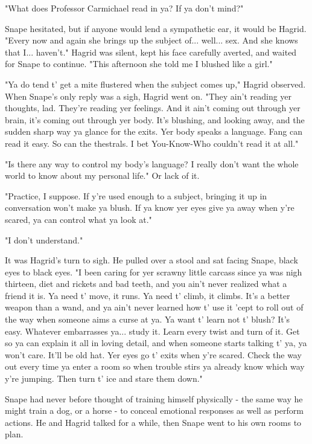 \documentclass[a4paper,11pt]{article}
\begin{document}
"What does Professor Carmichael read in ya? If ya don't mind?"

Snape hesitated, but if anyone would lend a sympathetic ear, it would be Hagrid. "Every now and again she brings up the subject of... well... sex. And she knows that I... haven't." Hagrid was silent, kept his face carefully averted, and waited for Snape to continue. "This afternoon she told me I blushed like a girl."

"Ya do tend t' get a mite flustered when the subject comes up," Hagrid observed. When Snape's only reply was a sigh, Hagrid went on. "They ain't reading yer thoughts, lad. They're reading yer feelings. And it ain't coming out through yer brain, it's coming out through yer body. It's blushing, and looking away, and the sudden sharp way ya glance for the exits. Yer body speaks a language. Fang can read it easy. So can the thestrals. I bet You-Know-Who couldn't read it at all."

"Is there any way to control my body's language? I really don't want the whole world to know about my personal life." Or lack of it.

"Practice, I suppose. If y're used enough to a subject, bringing it up in conversation won't make ya blush. If ya know yer eyes give ya away when y're scared, ya can control what ya look at."

"I don't understand."

It was Hagrid's turn to sigh. He pulled over a stool and sat facing Snape, black eyes to black eyes. "I been caring for yer scrawny little carcass since ya was nigh thirteen, diet and rickets and bad teeth, and you ain't never realized what a friend it is. Ya need t' move, it runs. Ya need t' climb, it climbs. It's a better weapon than a wand, and ya ain't never learned how t' use it 'cept to roll out of the way when someone aims a curse at ya. Ya want t' learn not t' blush? It's easy. Whatever embarrasses ya... study it. Learn every twist and turn of it. Get so ya can explain it all in loving detail, and when someone starts talking t' ya, ya won't care. It'll be old hat. Yer eyes go t' exits when y're scared. Check the way out every time ya enter a room so when trouble stirs ya already know which way y're jumping. Then turn t' ice and stare them down."

Snape had never before thought of training himself physically - the same way he might train a dog, or a horse - to conceal emotional responses as well as perform actions. He and Hagrid talked for a while, then Snape went to his own rooms to plan.
\end{document}
